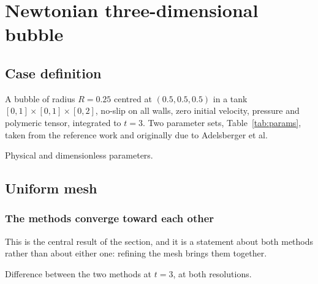 \section{Newtonian three-dimensional bubble}
\label{sec:newtonian}


\subsection{Case definition}

A bubble of radius $R = 0.25$ centred at $(0.5,0.5,0.5)$ in a tank
$[0,1]\times[0,1]\times[0,2]$, no-slip on all walls, zero initial velocity,
pressure and polymeric tensor, integrated to $t = 3$. Two parameter sets,
Table~\ref{tab:params}, taken from the reference work and originally due to
Adelsberger et al.

\begin{table}[htbp]
\centering
\caption{Physical and dimensionless parameters.}
\label{tab:params}
\small
{}
\end{table}

\subsection{Uniform mesh}

\subsubsection{The methods converge toward each other}

This is the central result of the section, and it is a statement about both
methods rather than about either one: refining the mesh brings them together.

\begin{table}[htbp]
\centering
\caption{Difference between the two methods at $t=3$, at both resolutions.}
\label{tab:convergence}
\small
\begin{adjustbox}{max width=\linewidth}
\end{adjustbox}
\end{table}

